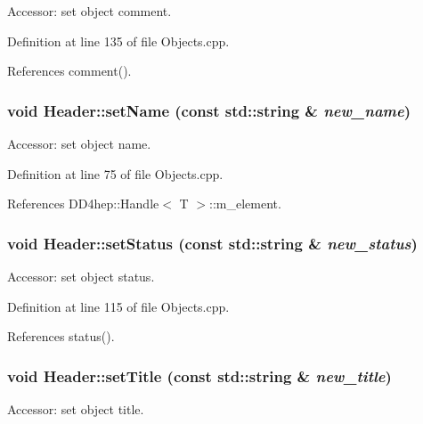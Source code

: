 Accessor: set object comment. 

Definition at line 135 of file Objects.cpp.

References comment().\hypertarget{class_d_d4hep_1_1_geometry_1_1_header_ae65f0f1c5b9f6c5697d0831a19b4056c}{
\subsubsection[{setName}]{\setlength{\rightskip}{0pt plus 5cm}void Header::setName (const std::string \& {\em new\_\-name})}}
\label{class_d_d4hep_1_1_geometry_1_1_header_ae65f0f1c5b9f6c5697d0831a19b4056c}


Accessor: set object name. 

Definition at line 75 of file Objects.cpp.

References DD4hep::Handle$<$ T $>$::m\_\-element.\hypertarget{class_d_d4hep_1_1_geometry_1_1_header_a16e8e70fe306e468d81ff2691612cd6d}{
\subsubsection[{setStatus}]{\setlength{\rightskip}{0pt plus 5cm}void Header::setStatus (const std::string \& {\em new\_\-status})}}
\label{class_d_d4hep_1_1_geometry_1_1_header_a16e8e70fe306e468d81ff2691612cd6d}


Accessor: set object status. 

Definition at line 115 of file Objects.cpp.

References status().\hypertarget{class_d_d4hep_1_1_geometry_1_1_header_a5e718143f204d4c58721e145772b896c}{
\subsubsection[{setTitle}]{\setlength{\rightskip}{0pt plus 5cm}void Header::setTitle (const std::string \& {\em new\_\-title})}}
\label{class_d_d4hep_1_1_geometry_1_1_header_a5e718143f204d4c58721e145772b896c}


Accessor: set object title. 


